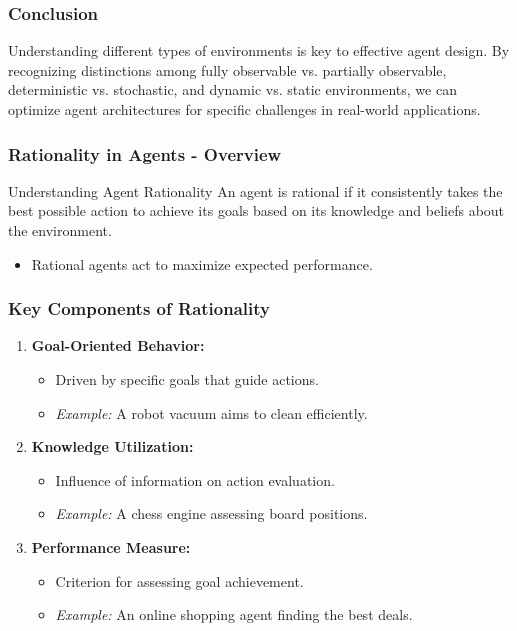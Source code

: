 \documentclass[aspectratio=169]{beamer}
\begin{document}
\begin{frame}[fragile]
    \frametitle{Conclusion}
    Understanding different types of environments is key to effective agent design. By recognizing distinctions among fully observable vs. partially observable, deterministic vs. stochastic, and dynamic vs. static environments, we can optimize agent architectures for specific challenges in real-world applications.
\end{frame}

\begin{frame}[fragile]
    \frametitle{Rationality in Agents - Overview}
    \begin{block}{Understanding Agent Rationality}
        An agent is rational if it consistently takes the best possible action to achieve its goals based on its knowledge and beliefs about the environment.
    \end{block}
    \begin{itemize}
        \item Rational agents act to maximize expected performance.
    \end{itemize}
\end{frame}

\begin{frame}[fragile]
    \frametitle{Key Components of Rationality}
    \begin{enumerate}
        \item \textbf{Goal-Oriented Behavior:}
            \begin{itemize}
                \item Driven by specific goals that guide actions.
                \item \textit{Example:} A robot vacuum aims to clean efficiently.
            \end{itemize}
            
        \item \textbf{Knowledge Utilization:}
            \begin{itemize}
                \item Influence of information on action evaluation.
                \item \textit{Example:} A chess engine assessing board positions.
            \end{itemize}
            
        \item \textbf{Performance Measure:}
            \begin{itemize}
                \item Criterion for assessing goal achievement.
                \item \textit{Example:} An online shopping agent finding the best deals.
            \end{itemize}
    \end{enumerate}
\end{frame}
\end{document}

